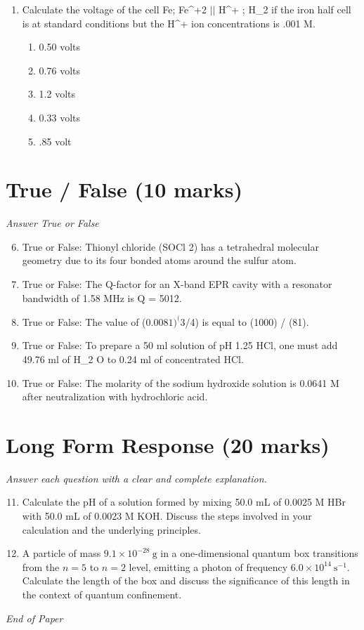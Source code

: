 \documentclass[12pt]{article}
\begin{document}
\begin{enumerate}[label=\arabic*.]
\begin{enumerate}[label=(\alph*)]
    \item The 2 d peak has the lowest energy.
    \item The 1 d peak has the lowest energy.
    \item The 1 p peak has the lowest energy.
\end{enumerate}
\item Calculate the voltage of the cell Fe; Fe^+2 \ensuremath{\vert}\ensuremath{\vert} H^+ ; H\_2 if the iron half cell is at standard conditions but the H^+ ion concentrations is .001 M.
\begin{enumerate}[label=(\alph*)]
    \item 0.50 volts
    \item 0.76 volts
    \item 1.2 volts
    \item 0.33 volts
    \item .85 volt
\end{enumerate}
\end{enumerate}

\section*{True / False (10 marks)}
\textit{Answer True or False}
\begin{enumerate}[label=\arabic*.]
\setcounter{enumi}{5}
\item True or False: Thionyl chloride (SOCl 2) has a tetrahedral molecular geometry due to its four bonded atoms around the sulfur atom.
\item True or False: The Q-factor for an X-band EPR cavity with a resonator bandwidth of 1.58 MHz is Q = 5012.
\item True or False: The value of (0.$0081)^(3$/4) is equal to (1000) / (81).
\item True or False: To prepare a 50 ml solution of pH 1.25 HCl, one must add 49.76 ml of H\_2 O to 0.24 ml of concentrated HCl.
\item True or False: The molarity of the sodium hydroxide solution is 0.0641 M after neutralization with hydrochloric acid.
\end{enumerate}

\section*{Long Form Response (20 marks)}
\textit{Answer each question with a clear and complete explanation.}
\begin{enumerate}[label=\arabic*.]
\setcounter{enumi}{10}
\item Calculate the pH of a solution formed by mixing 50.0 mL of 0.0025 M HBr with 50.0 mL of 0.0023 M KOH. Discuss the steps involved in your calculation and the underlying principles.
\item A particle of mass $9.1 \times 10^{-28} \mathrm{~g}$ in a one-dimensional quantum box transitions from the $n=5$ to $n=2$ level, emitting a photon of frequency $6.0 \times 10^{14} \mathrm{~s}^{-1}$. Calculate the length of the box and discuss the significance of this length in the context of quantum confinement.
\end{enumerate}

\vfill
\noindent\textit{End of Paper}
\end{document}
